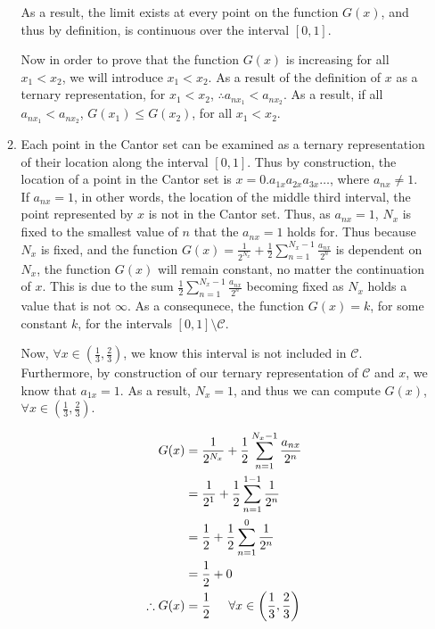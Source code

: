 \documentclass[a4paper]{article}
\begin{document}
\begin{enumerate}[label=\textbf{\arabic*.}]
\begin{enumerate}
		As a result, the limit exists at every point on the function $G(x)$, and thus by definition, is continuous over the interval $[0,1]$.

		\bigbreak

		Now in order to prove that the function $G(x)$ is increasing for all $ x_1 < x_2$, we will introduce $x_1 < x_2$. As a result of the definition of $x$ as a ternary representation, for $x_1 < x_2$, $\therefore a_{nx_1} < a_{nx_2}$. As a result, if all $a_{nx_1} < a_{nx_2}$, $G(x_1) \leq G(x_2)$, for all $ x_1 < x_2$.

		\bigbreak

		\item Each point in the Cantor set can be examined as a ternary representation of their location along the interval $[0,1]$. Thus by construction, the location of a point in the Cantor set is $x=0.a_{1x}a_{2x}a_{3x}\dots$, where $a_{nx} \neq 1$. If $a_{nx} = 1$, in other words, the location of the middle third interval, the point represented by $x$ is not in the Cantor set. Thus, as $a_{nx} = 1$, $N_x$ is fixed to the smallest value of $n$ that the $a_{nx} = 1$ holds for. Thus because $N_x$ is fixed, and the function $G(x) = \displaystyle{\frac{1}{2^{N_x}}} + \displaystyle{\frac{1}{2}\sum_{n=1}^{N_x-1}\frac{a_{nx}}{2^{n}}}$ is dependent on $N_x$, the function $G(x)$ will remain constant, no matter the continuation of $x$. This is due to the sum $\displaystyle{\frac{1}{2}\sum_{n=1}^{N_x-1}\frac{a_{nx}}{2^{n}}}$ becoming fixed as $N_x$ holds a value that is not $\infty$. As a consequnece, the function $G(x) = k$, for some constant $k$, for the intervals $[0,1] \setminus \mathcal{C}$.

		\bigbreak

		Now, $\forall x \in \left(\frac{1}{3},\frac{2}{3}\right)$, we know this interval is not included in $\mathcal{C}$. Furthermore, by construction of our ternary representation of $\mathcal{C}$ and $x$, we know that $a_{1x} = 1$. As a result, $N_x = 1$, and thus we can compute $G(x)$, $\forall x \in \left(\frac{1}{3},\frac{2}{3}\right)$.

		\begin{align*}
		G(x) & = \frac{1}{2^{N_x}} + \frac{1}{2}\sum_{n=1}^{N_x-1}\frac{a_{nx}}{2^{n}}\\
		& = \frac{1}{2^{1}} + \frac{1}{2}\sum_{n=1}^{1-1}\frac{1}{2^{n}}\\
		& = \frac{1}{2} + \frac{1}{2}\sum_{n=1}^{0}\frac{1}{2^{n}}\\
		& = \frac{1}{2} + 0\\
		\therefore G(x) & = \frac{1}{2} \hspace{5mm} \forall x \in \left(\frac{1}{3},\frac{2}{3}\right)\\
		\end{align*}


\end{enumerate}
\end{enumerate}
\end{document}
